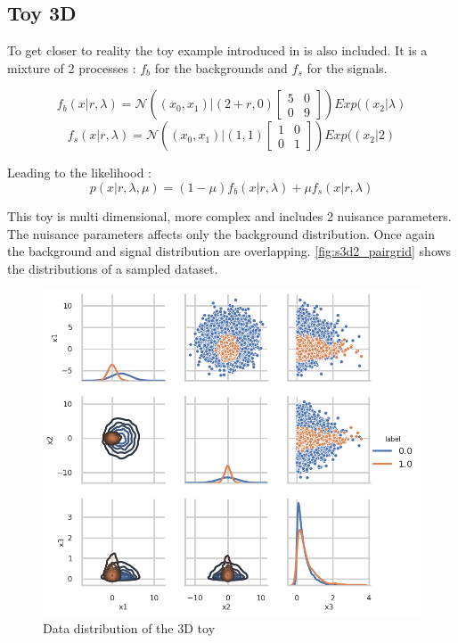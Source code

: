 \subsection{Toy 3D} %
\label{sub:toy_3d}

To get closer to reality the toy example introduced in \cite{DECASTRO2019170inferno} is also included.
It is a mixture of 2 processes : $f_b$ for the backgrounds and $f_s$ for the signals.

\begin{equation}
	f_b (x|r, \lambda) = \mathcal N \left ( (x_0, x_1) | (2+r, 0) 
	\begin{bmatrix} 5 & 0 \\ 0 & 9 \end{bmatrix} \right ) Exp((x_2| \lambda)
\end{equation}
\begin{equation}
	f_s (x|r, \lambda) = \mathcal N \left ( (x_0, x_1) | (1, 1) 
	\begin{bmatrix} 1 & 0 \\ 0 & 1 \end{bmatrix} \right ) Exp((x_2| 2)
\end{equation}

Leading to the likelihood :
\begin{equation}
	p(x | r, \lambda, \mu ) = (1-\mu) f_b(x|r, \lambda) + \mu f_s(x|r, \lambda)
\end{equation}

This toy is multi dimensional, more complex and includes 2 nuisance parameters.
The nuisance parameters affects only the background distribution.
Once again the background and signal distribution are overlapping.
\autoref{fig:s3d2_pairgrid} shows the distributions of a sampled dataset.

\begin{figure}[htb]
    \includegraphics[width=\linewidth]{s3d2/pairgrid}
    \caption{Data distribution of the 3D toy}
    \label{fig:s3d2_pairgrid}
\end{figure}












